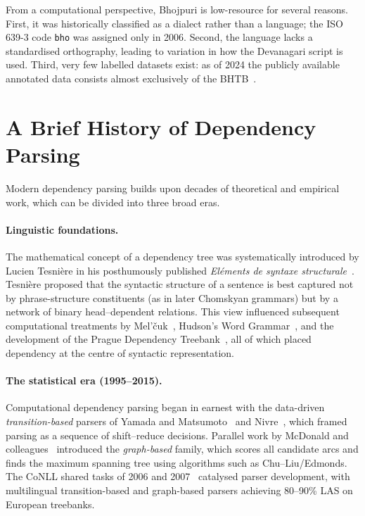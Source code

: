 \documentclass[12pt,a4paper,oneside]{report}
\newcommand{\bho}{Bhojpuri}
\begin{document}
From a computational perspective, \bho{} is low-resource for several reasons.
First, it was historically classified as a dialect rather than a language; the
ISO 639-3 code \texttt{bho} was assigned only in 2006. Second, the language
lacks a standardised orthography, leading to variation in how the Devanagari script
is used. Third, very few labelled datasets exist: as of 2024 the publicly available
annotated data consists almost exclusively of the BHTB~\citep{bhtb2022}.

\section{A Brief History of Dependency Parsing}
\label{sec:dp_history}

Modern dependency parsing builds upon decades of theoretical and empirical work,
which can be divided into three broad eras.

\paragraph{Linguistic foundations.}
The mathematical concept of a dependency tree was systematically introduced by
Lucien Tesni\`ere in his posthumously published \emph{El\'ements de syntaxe
structurale}~\citep{tesniere1959}. Tesni\`ere proposed that the syntactic structure
of a sentence is best captured not by phrase-structure constituents (as in
later Chomskyan grammars) but by a network of binary head--dependent relations.
This view influenced subsequent computational treatments by
Mel'\v{c}uk~\citep{melcuk1988dependency}, Hudson's Word
Grammar~\citep{hudson2007language}, and the development of the Prague
Dependency Treebank~\citep{hajic2006pdt}, all of which placed dependency at the
centre of syntactic representation.

\paragraph{The statistical era (1995--2015).}
Computational dependency parsing began in earnest with the data-driven
\emph{transition-based} parsers of Yamada and Matsumoto~\citep{yamada2003}
and Nivre~\citep{nivre2003efficient}, which framed parsing as a sequence of
shift--reduce decisions. Parallel work by McDonald and
colleagues~\citep{mcdonald2005maxspanning,mcdonald2006multilingual} introduced
the \emph{graph-based} family, which scores all candidate arcs and finds the
maximum spanning tree using algorithms such as Chu--Liu/Edmonds. The CoNLL
shared tasks of 2006 and 2007~\citep{buchholz2006conll,nivre2007conllX} catalysed
parser development, with multilingual transition-based and graph-based parsers
achieving 80--90\% LAS on European treebanks.
\end{document}
